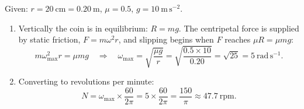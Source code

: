 \documentclass[11pt]{article}
\begin{document}
\begin{corrige}
Given: $r = 20\ \mathrm{cm} = 0.20\ \mathrm{m}$, $\mu = 0.5$, $g = 10\ \mathrm{m\,s^{-2}}$.
\begin{enumerate}
\item Vertically the coin is in equilibrium: $R = mg$. The centripetal force is supplied by static friction, $F = m\omega^{2}r$, and slipping begins when $F$ reaches $\mu R = \mu mg$:
\[ m\omega_{\max}^{2}r = \mu mg \quad\Longrightarrow\quad \omega_{\max} = \sqrt{\frac{\mu g}{r}} = \sqrt{\frac{0.5\times 10}{0.20}} = \sqrt{25} = 5\ \mathrm{rad\,s^{-1}}. \]
\item Converting to revolutions per minute:
\[ N = \omega_{\max}\times\frac{60}{2\pi} = 5\times\frac{60}{2\pi} = \frac{150}{\pi} \approx 47.7\ \mathrm{rpm}. \]
\end{enumerate}
\end{corrige}
\end{document}
